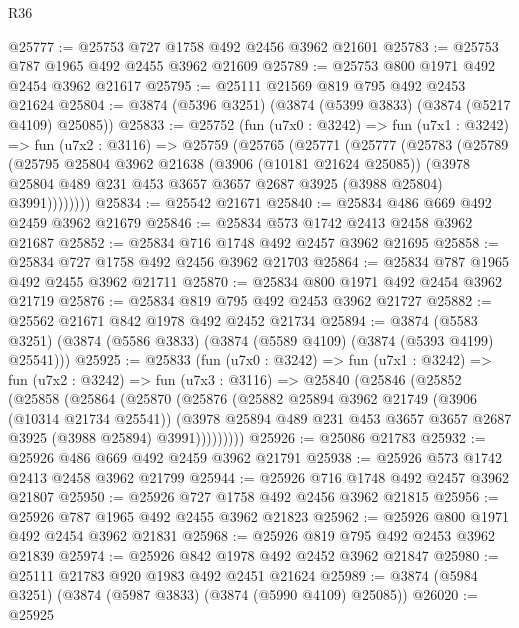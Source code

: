 \begin{lexlean}{R36}
\begin{coremodule}
@25777 := @25753 @727 @1758 @492 @2456 @3962 @21601
@25783 := @25753 @787 @1965 @492 @2455 @3962 @21609
@25789 := @25753 @800 @1971 @492 @2454 @3962 @21617
@25795 := @25111 @21569 @819 @795 @492 @2453 @21624
@25804 := @3874 (@5396 @3251) (@3874 (@5399 @3833) (@3874 (@5217 @4109) @25085))
@25833 := @25752
    (fun (u7x0 : @3242) =>
    fun (u7x1 : @3242) =>
    fun (u7x2 : @3116) =>
    @25759
      (@25765
        (@25771
          (@25777
            (@25783
              (@25789
                (@25795
                  @25804
                  @3962
                  @21638
                  (@3906 (@10181 @21624 @25085))
                  (@3978 @25804 @489 @231 @453 @3657 @3657 @2687 @3925 (@3988 @25804) @3991))))))))
@25834 := @25542 @21671
@25840 := @25834 @486 @669 @492 @2459 @3962 @21679
@25846 := @25834 @573 @1742 @2413 @2458 @3962 @21687
@25852 := @25834 @716 @1748 @492 @2457 @3962 @21695
@25858 := @25834 @727 @1758 @492 @2456 @3962 @21703
@25864 := @25834 @787 @1965 @492 @2455 @3962 @21711
@25870 := @25834 @800 @1971 @492 @2454 @3962 @21719
@25876 := @25834 @819 @795 @492 @2453 @3962 @21727
@25882 := @25562 @21671 @842 @1978 @492 @2452 @21734
@25894 := @3874
    (@5583 @3251)
    (@3874 (@5586 @3833) (@3874 (@5589 @4109) (@3874 (@5393 @4199) @25541)))
@25925 := @25833
    (fun (u7x0 : @3242) =>
    fun (u7x1 : @3242) =>
    fun (u7x2 : @3242) =>
    fun (u7x3 : @3116) =>
    @25840
      (@25846
        (@25852
          (@25858
            (@25864
              (@25870
                (@25876
                  (@25882
                    @25894
                    @3962
                    @21749
                    (@3906 (@10314 @21734 @25541))
                    (@3978
                      @25894
                      @489
                      @231
                      @453
                      @3657
                      @3657
                      @2687
                      @3925
                      (@3988 @25894)
                      @3991)))))))))
@25926 := @25086 @21783
@25932 := @25926 @486 @669 @492 @2459 @3962 @21791
@25938 := @25926 @573 @1742 @2413 @2458 @3962 @21799
@25944 := @25926 @716 @1748 @492 @2457 @3962 @21807
@25950 := @25926 @727 @1758 @492 @2456 @3962 @21815
@25956 := @25926 @787 @1965 @492 @2455 @3962 @21823
@25962 := @25926 @800 @1971 @492 @2454 @3962 @21831
@25968 := @25926 @819 @795 @492 @2453 @3962 @21839
@25974 := @25926 @842 @1978 @492 @2452 @3962 @21847
@25980 := @25111 @21783 @920 @1983 @492 @2451 @21624
@25989 := @3874 (@5984 @3251) (@3874 (@5987 @3833) (@3874 (@5990 @4109) @25085))
@26020 := @25925

\end{coremodule}
\end{lexlean}
